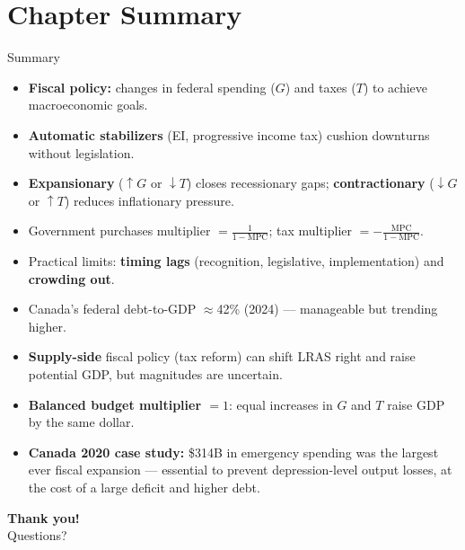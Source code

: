\documentclass[aspectratio=169]{beamer}
\begin{document}
\section*{Chapter Summary}

\begin{frame}{Summary}
\transfade
\begin{itemize}[<+->]
  \item \textbf{Fiscal policy:} changes in federal spending ($G$) and taxes ($T$) to achieve macroeconomic goals.
  \item \textbf{Automatic stabilizers} (EI, progressive income tax) cushion downturns without legislation.
  \item \textbf{Expansionary} ($\uparrow G$ or $\downarrow T$) closes recessionary gaps; \textbf{contractionary} ($\downarrow G$ or $\uparrow T$) reduces inflationary pressure.
  \item Government purchases multiplier $= \frac{1}{1-\text{MPC}}$; tax multiplier $= -\frac{\text{MPC}}{1-\text{MPC}}$.
  \item Practical limits: \textbf{timing lags} (recognition, legislative, implementation) and \textbf{crowding out}.
  \item Canada's federal debt-to-GDP $\approx$42\% (2024) --- manageable but trending higher.
  \item \textbf{Supply-side} fiscal policy (tax reform) can shift LRAS right and raise potential GDP, but magnitudes are uncertain.
  \item \textbf{Balanced budget multiplier $= 1$}: equal increases in $G$ and $T$ raise GDP by the same dollar.
  \item \textbf{Canada 2020 case study:} \$314B in emergency spending was the largest ever fiscal expansion --- essential to prevent depression-level output losses, at the cost of a large deficit and higher debt.
\end{itemize}
\end{frame}

\begin{frame}
\centering
\Huge \textbf{Thank you!}\\[1em]
\large Questions?
\end{frame}
\end{document}
